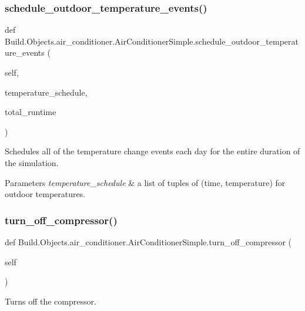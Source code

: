 \subsubsection{\texorpdfstring{schedule\+\_\+outdoor\+\_\+temperature\+\_\+events()}{schedule\_outdoor\_temperature\_events()}}
{\footnotesize\ttfamily def Build.\+Objects.\+air\+\_\+conditioner.\+Air\+Conditioner\+Simple.\+schedule\+\_\+outdoor\+\_\+temperature\+\_\+events (\begin{DoxyParamCaption}\item[{}]{self,  }\item[{}]{temperature\+\_\+schedule,  }\item[{}]{total\+\_\+runtime }\end{DoxyParamCaption})}



Schedules all of the temperature change events each day for the entire duration of the simulation. 


\begin{DoxyParams}{Parameters}
{\em temperature\+\_\+schedule} & a list of tuples of (time, temperature) for outdoor temperatures. \\
\hline
\end{DoxyParams}
\mbox{\label{class_build_1_1_objects_1_1air__conditioner_1_1_air_conditioner_simple_affced4fc3f6e8260d31c1690a8b5614d}} 
\subsubsection{\texorpdfstring{turn\+\_\+off\+\_\+compressor()}{turn\_off\_compressor()}}
{\footnotesize\ttfamily def Build.\+Objects.\+air\+\_\+conditioner.\+Air\+Conditioner\+Simple.\+turn\+\_\+off\+\_\+compressor (\begin{DoxyParamCaption}\item[{}]{self }\end{DoxyParamCaption})}



Turns off the compressor. 

